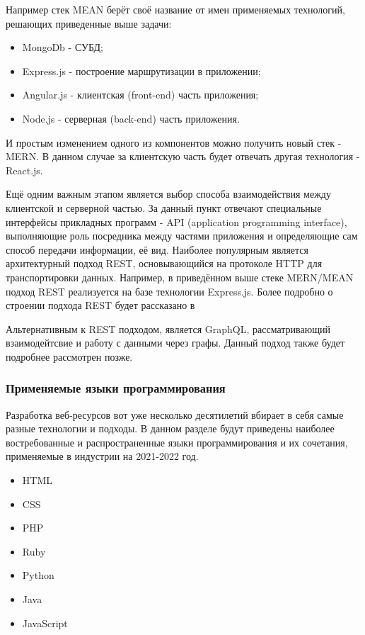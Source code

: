         Например стек MEAN берёт своё название от имен применяемых технологий, решающих приведенные выше задачи:
        \begin{itemize}
            \item MongoDb - СУБД;
            \item Express.js - построение маршрутизации в приложении;
            \item Angular.js - клиентская (front-end) часть приложения;
            \item Node.js - серверная (back-end) часть приложения.
        \end{itemize}
        
        И простым изменением одного из компонентов можно получить новый стек - MERN.
        В данном случае за клиентскую часть будет отвечать другая технология - React.js.

        Ещё одним важным этапом является выбор способа взаимодействия между клиентской и серверной частью.
        За данный пункт отвечают специальные интерфейсы прикладных программ - API (application programming interface), выполняющие роль посредника между частями приложения и определяющие сам способ передачи информации, её вид.
        Наиболее популярным является архитектурный подход REST, основывающийся на протоколе HTTP для транспортировки данных.
        Например, в приведённом выше стеке MERN/MEAN подход REST реализуется на базе технологии Express.js.
        Более подробно о строении подхода REST будет рассказано в %

        Альтернативным к REST подходом, является GraphQL, рассматривающий взаимодейтсвие и работу с данными через графы.
        Данный подход также будет подробнее рассмотрен позже.


    \subsubsection{Применяемые языки программирования}
        Разработка веб-ресурсов вот уже несколько десятилетий вбирает в себя самые разные технологии и подходы.
        В данном разделе будут приведены наиболее востребованные и распространенные языки программирования и их сочетания, применяемые в индустрии на 2021-2022 год.
        \begin{itemize}
            \item HTML
            \item CSS
            \item PHP
            \item Ruby
            \item Python
            \item Java
            \item JavaScript
        \end{itemize}
        
